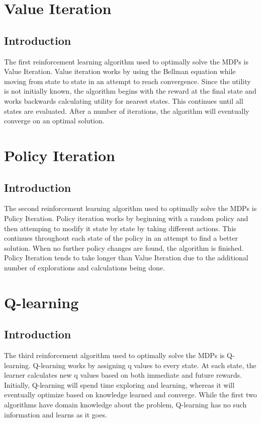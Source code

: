 \documentclass[h]{article}
\begin{document}
\section*{Value Iteration}
\subsection*{Introduction}
The first reinforcement learning algorithm used to optimally solve the MDPs is Value Iteration. 
 Value iteration works by using the Bellman equation while moving from 
 state to state in an attempt to reach convergence.  Since the utility is not 
 initially known, the algorithm begins with the reward at the final state and works 
 backwards calculating utility for nearest states.  This continues 
 until all states are evaluated.  After a number of iterations, the algorithm 
 will eventually converge on an optimal solution.
 
\section*{Policy Iteration}
\subsection*{Introduction}
The second reinforcement learning algorithm used to optimally solve the MDPs is 
Policy Iteration.  Policy iteration works by beginning with a random policy and then 
attemping to modify it state by state by taking different actions.  This continues throughout each state of the policy in an attempt
 to find a better solution.  When no further policy changes are found, the algorithm 
 is finished.  Policy Iteration tends to take longer than Value Iteration due to 
 the additional number of explorations and calculations being done.
 
\section*{Q-learning}
\subsection*{Introduction}
The third reinforcement algorithm used to optimally solve the MDPs is 
Q-learning.  Q-learning works by assigning q values to every state.  At each state, the learner calculates new 
q values based on both immediate and future rewards.  Initially, Q-learning will 
spend time exploring and learning, whereas it will eventually optimize
based on knowledge learned and converge.  While the first two algorithms have domain knowledge about the problem, 
Q-learning has no such information and learns as it goes. 
\end{document}
